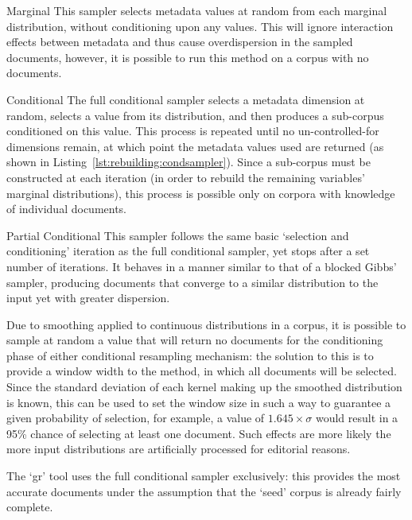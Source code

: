 \begin{itemizeTitle}
    \item[Marginal] This sampler selects metadata values at random from each marginal distribution, without conditioning upon any values.  This will ignore interaction effects between metadata and thus cause overdispersion in the sampled documents, however, it is possible to run this method on a corpus with no documents.

    \item[Conditional] The full conditional sampler selects a metadata dimension at random, selects a value from its distribution, and then produces a sub-corpus conditioned on this value.  This process is repeated until no un-controlled-for dimensions remain, at which point the metadata values used are returned (as shown in Listing~\ref{lst:rebuilding:condsampler}).  Since a sub-corpus must be constructed at each iteration (in order to rebuild the remaining variables' marginal distributions), this process is possible only on corpora with knowledge of individual documents.
    
    \item[Partial Conditional] This sampler follows the same basic `selection and conditioning' iteration as the full conditional sampler, yet stops after a set number of iterations.  It behaves in a manner similar to that of a blocked Gibbs' sampler, producing documents that converge to a similar distribution to the input yet with greater dispersion.
\end{itemizeTitle}

Due to smoothing applied to continuous distributions in a corpus, it is possible to sample at random a value that will return no documents for the conditioning phase of either conditional resampling mechanism: the solution to this is to provide a window width to the method, in which all documents will be selected.  Since the standard deviation of each kernel making up the smoothed distribution is known, this can be used to set the window size in such a way to guarantee a given probability of selection, for example, a value of $1.645 \times \sigma$ would result in a 95\% chance of selecting at least one document.  Such effects are more likely the more input distributions are artificially processed for editorial reasons.

The `gr' tool uses the full conditional sampler exclusively: this provides the most accurate documents under the assumption that the `seed' corpus is already fairly complete.



